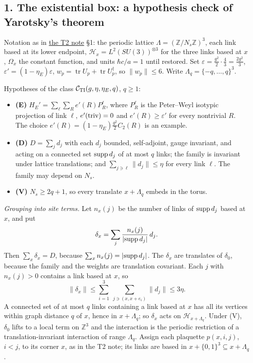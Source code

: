 \documentclass[11pt,a4paper]{article}
\newcommand{\tightlist}{\setlength{\itemsep}{0pt}\setlength{\parskip}{0pt}}
\begin{document}
\hypertarget{the-existential-box-a-hypothesis-check-of-yarotskys-theorem}{%
\subsection{1. The existential box: a hypothesis check of Yarotsky's
theorem}\label{the-existential-box-a-hypothesis-check-of-yarotskys-theorem}}

Notation as in \href{strong-coupling-uniform-gap.md}{the T2 note} §1:
the periodic lattice \(\Lambda=(\mathbb Z/N_s\mathbb Z)^3\), each link
based at its lower endpoint, \(\mathcal H_x=L^2(SU(3))^{\otimes3}\) for
the three links based at \(x\), \(\Omega_x\) the constant function, and
units \(\hbar c/a=1\) until restored. Set
\(\varepsilon=\frac{g^2}2\cdot\frac43=\frac{2g^2}3\),
\(\varepsilon'=(1-\eta_E)\varepsilon\),
\(w_p=\operatorname{tr}U_p+\operatorname{tr}U_p^\dagger\), so
\(\|w_p\|\le6\). Write \(\Lambda_q=\{-q,\dots,q\}^3\).

Hypotheses of the class \(\mathcal C_{\rm TI}(g,\eta,\eta_E,q)\),
\(q\ge1\):

\begin{itemize}
\tightlist
\item
  \textbf{(E)} \(H_E'=\sum_\ell\sum_Re'(R)P^\ell_R\), where \(P^\ell_R\)
  is the Peter--Weyl isotypic projection of link \(\ell\),
  \(e'({\rm triv})=0\) and \(e'(R)\ge\varepsilon'\) for every nontrivial
  \(R\). The choice \(e'(R)=(1-\eta_E)\frac{g^2}2C_2(R)\) is an example.
\item
  \textbf{(D)} \(D=\sum_jd_j\) with each \(d_j\) bounded, self-adjoint,
  gauge invariant, and acting on a connected set \({\rm supp}\,d_j\) of
  at most \(q\) links; the family is invariant under lattice
  translations; and \(\sum_{j\ni\ell}\|d_j\|\le\eta\) for every link
  \(\ell\). The family may depend on \(N_s\).
\item
  \textbf{(V)} \(N_s\ge2q+1\), so every translate \(x+\Lambda_q\) embeds
  in the torus.
\end{itemize}

\emph{Grouping into site terms.} Let \(n_x(j)\) be the number of links
of \({\rm supp}\,d_j\) based at \(x\), and put
\[\delta_x=\sum_j\frac{n_x(j)}{|{\rm supp}\,d_j|}\,d_j.\] Then
\(\sum_x\delta_x=D\), because \(\sum_xn_x(j)=|{\rm supp}\,d_j|\). The
\(\delta_x\) are translates of \(\delta_0\), because the family and the
weights are translation covariant. Each \(j\) with \(n_x(j)>0\) contains
a link based at \(x\), so
\[\|\delta_x\|\le\sum_{i=1}^3\ \sum_{j\ni(x,x+e_i)}\|d_j\|\le3\eta .\] A
connected set of at most \(q\) links containing a link based at \(x\)
has all its vertices within graph distance \(q\) of \(x\), hence in
\(x+\Lambda_q\); so \(\delta_x\) acts on \(\mathcal H_{x+\Lambda_q}\).
Under (V), \(\delta_0\) lifts to a local term on \(\mathbb Z^3\) and the
interaction is the periodic restriction of a translation-invariant
interaction of range \(\Lambda_q\). Assign each plaquette \(p(x,i,j)\),
\(i<j\), to its corner \(x\), as in the T2 note; its links are based in
\(x+\{0,1\}^3\subseteq x+\Lambda_q\).
\end{document}
